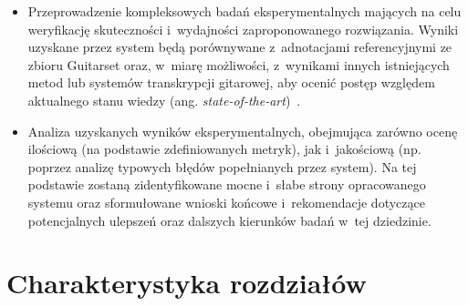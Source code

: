 \begin{itemize}
    \item Przeprowadzenie kompleksowych badań eksperymentalnych mających na celu weryfikację skuteczności i~wydajności zaproponowanego rozwiązania. Wyniki uzyskane przez system będą porównywane z~adnotacjami referencyjnymi ze zbioru Guitarset oraz, w~miarę możliwości, z~wynikami innych istniejących metod lub systemów transkrypcji gitarowej, aby ocenić postęp względem aktualnego stanu wiedzy (ang. \textit{state-of-the-art})~\autocite{Benetos2019AutomaticMusicTranscription}.
    \item Analiza uzyskanych wyników eksperymentalnych, obejmująca zarówno ocenę ilościową (na podstawie zdefiniowanych metryk), jak i~jakościową (np. poprzez analizę typowych błędów popełnianych przez system). Na tej podstawie zostaną zidentyfikowane mocne i~słabe strony opracowanego systemu oraz sformułowane wnioski końcowe i~rekomendacje dotyczące potencjalnych ulepszeń oraz dalszych kierunków badań w~tej dziedzinie.
\end{itemize}

\section{Charakterystyka rozdziałów}
\label{sec:charakterystyka_rozdzialow}

